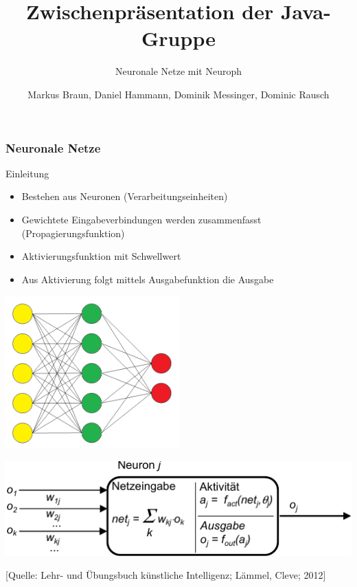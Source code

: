 \documentclass[18pt]{beamer}
\title{Zwischenpräsentation der Java-Gruppe}
\subtitle{Neuronale Netze mit Neuroph}
\author{Markus Braun, Daniel Hammann, Dominik Messinger, Dominic Rausch}
\institute{Institut für Programmstrukturen und Datenorganisation (IPD), Lehrstuhl für Programmiersysteme}
\begin{document}
	\maketitle

	\begin{frame}[c]\frametitle{Neuronale Netze}
		\begin{block}{Einleitung}
		    \begin{itemize}
			    \item Bestehen aus Neuronen (Verarbeitungseinheiten)
		    	\item Gewichtete Eingabeverbindungen werden zusammenfasst (Propagierungsfunktion)
		    	\item Aktivierungsfunktion mit Schwellwert
		    	\item Aus Aktivierung folgt mittels Ausgabefunktion die Ausgabe
		    \end{itemize}		    
		\end{block}	
		\vspace{.5cm}
			\begin{minipage}[c]{0.48\textwidth}
				\begin{center}
				\includegraphics[width=0.5\textwidth]{images/ann.png}
				\end{center}
			\end{minipage}	
			\begin{minipage}[c]{0.48\textwidth}
				\begin{center}
				\includegraphics[width=\textwidth]{images/Neuron}
				\end{center}				
			\end{minipage}
\begin{flushright}
			\tiny{[Quelle: Lehr- und Übungsbuch künstliche Intelligenz; Lämmel, Cleve; 2012]}
\end{flushright}
	\end{frame}
	
\end{document}
